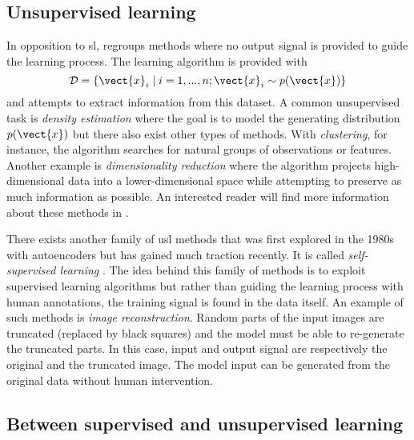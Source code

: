 \subsection{Unsupervised learning}
\label{ssec:backml:usl}

In opposition to \acrlong{sl},  regroups methods where no output
signal is provided to guide the learning process. The learning algorithm is provided
with
\begin{equation}
\mathcal{D} = \left\{\vect{x}_i \mid i = 1,..., n ; \vect{x}_i \sim p(\vect{x})\right\}
\end{equation}
and attempts to extract information from this dataset. A common unsupervised task
is \textit{density estimation} where the goal is to model the generating distribution
$p(\vect{x})$ but there also exist other types of methods. With \textit{clustering},
for instance, the algorithm searches for natural groups of observations or features.
Another example is \textit{dimensionality reduction} where the algorithm projects
high-dimensional data into a lower-dimensional space while attempting to preserve
as much information as possible. An interested reader will find more information
about these methods in \cite{hastie2017elements}. 

There exists another family of \acrlong{usl} methods that was first 
explored in the 1980s with autoencoders \cite{ballard1987modular, le1987modeles, bourlard1988auto} 
but has gained much traction recently. It is called \textit{self-supervised learning}
\cite{lecun2021self}. The idea behind this family of methods is to exploit
supervised learning algorithms but rather than guiding the learning process with
human annotations, the training signal is found in the data itself. An example of
such methods is \textit{image reconstruction}. Random parts of the input images
are truncated (\eg replaced by black squares) and the model must be able to
re-generate the truncated parts. In this case, input and output signal are
respectively the original and the truncated image. The model input can be generated
from the original data without human intervention.

\subsection{Between supervised and unsupervised learning}
\label{ssec:backml:inbetween}

